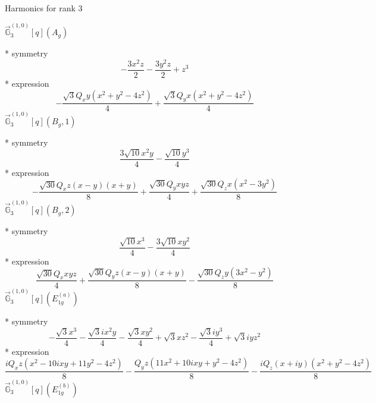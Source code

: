 \documentclass[fleqn,8pt]{jsarticle}
\begin{document}
\noindent * Harmonics for rank 3

\noindent\quad $\vec{\mathbb{G}}_{3}^{(1,0)}[q](A_{g})$

\noindent\quad ** symmetry
\begin{dmath*}
- \frac{3 x^{2} z}{2} - \frac{3 y^{2} z}{2} + z^{3}
\end{dmath*}
\noindent\quad ** expression
\begin{dmath*}
- \frac{\sqrt{3} Q_{x} y \left(x^{2} + y^{2} - 4 z^{2}\right)}{4} + \frac{\sqrt{3} Q_{y} x \left(x^{2} + y^{2} - 4 z^{2}\right)}{4}
\end{dmath*}
\noindent\quad $\vec{\mathbb{G}}_{3}^{(1,0)}[q](B_{g},1)$

\noindent\quad ** symmetry
\begin{dmath*}
\frac{3 \sqrt{10} x^{2} y}{4} - \frac{\sqrt{10} y^{3}}{4}
\end{dmath*}
\noindent\quad ** expression
\begin{dmath*}
- \frac{\sqrt{30} Q_{x} z \left(x - y\right) \left(x + y\right)}{8} + \frac{\sqrt{30} Q_{y} x y z}{4} + \frac{\sqrt{30} Q_{z} x \left(x^{2} - 3 y^{2}\right)}{8}
\end{dmath*}
\noindent\quad $\vec{\mathbb{G}}_{3}^{(1,0)}[q](B_{g},2)$

\noindent\quad ** symmetry
\begin{dmath*}
\frac{\sqrt{10} x^{3}}{4} - \frac{3 \sqrt{10} x y^{2}}{4}
\end{dmath*}
\noindent\quad ** expression
\begin{dmath*}
\frac{\sqrt{30} Q_{x} x y z}{4} + \frac{\sqrt{30} Q_{y} z \left(x - y\right) \left(x + y\right)}{8} - \frac{\sqrt{30} Q_{z} y \left(3 x^{2} - y^{2}\right)}{8}
\end{dmath*}
\noindent\quad $\vec{\mathbb{G}}_{3}^{(1,0)}[q](E_{1g}^{(a)})$

\noindent\quad ** symmetry
\begin{dmath*}
- \frac{\sqrt{3} x^{3}}{4} - \frac{\sqrt{3} i x^{2} y}{4} - \frac{\sqrt{3} x y^{2}}{4} + \sqrt{3} x z^{2} - \frac{\sqrt{3} i y^{3}}{4} + \sqrt{3} i y z^{2}
\end{dmath*}
\noindent\quad ** expression
\begin{dmath*}
\frac{i Q_{x} z \left(x^{2} - 10 i x y + 11 y^{2} - 4 z^{2}\right)}{8} - \frac{Q_{y} z \left(11 x^{2} + 10 i x y + y^{2} - 4 z^{2}\right)}{8} - \frac{i Q_{z} \left(x + i y\right) \left(x^{2} + y^{2} - 4 z^{2}\right)}{8}
\end{dmath*}
\noindent\quad $\vec{\mathbb{G}}_{3}^{(1,0)}[q](E_{1g}^{(b)})$
\end{document}
